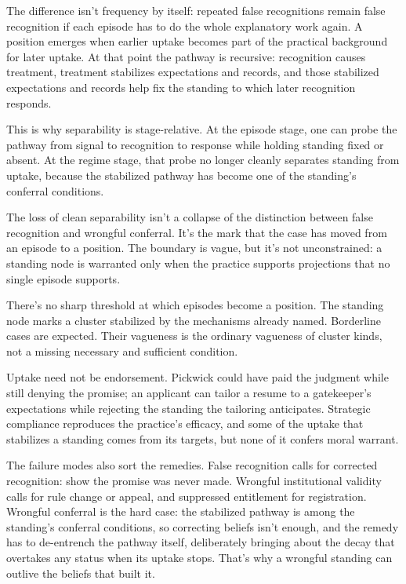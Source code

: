 \documentclass[12pt]{article}
\begin{document}
The difference isn't frequency by itself: repeated false recognitions remain false recognition if each episode has to do the whole explanatory work again. A position emerges when earlier uptake becomes part of the practical background for later uptake. At that point the pathway is recursive: recognition causes treatment, treatment stabilizes expectations and records, and those stabilized expectations and records help fix the standing to which later recognition responds.

This is why separability is stage-relative. At the episode stage, one can probe the pathway from signal to recognition to response while holding standing fixed or absent. At the regime stage, that probe no longer cleanly separates standing from uptake, because the stabilized pathway has become one of the standing's conferral conditions.

The loss of clean separability isn't a collapse of the distinction between false recognition and wrongful conferral. It's the mark that the case has moved from an episode to a position. The boundary is vague, but it's not unconstrained: a standing node is warranted only when the practice supports projections that no single episode supports.

There's no sharp threshold at which episodes become a position. The standing node marks a cluster stabilized by the mechanisms already named. Borderline cases are expected. Their vagueness is the ordinary vagueness of cluster kinds, not a missing necessary and sufficient condition.

Uptake need not be endorsement. Pickwick could have paid the judgment while still denying the promise; an applicant can tailor a resume to a gatekeeper's expectations while rejecting the standing the tailoring anticipates. Strategic compliance reproduces the practice's efficacy, and some of the uptake that stabilizes a standing comes from its targets, but none of it confers moral warrant.

The failure modes also sort the remedies. False recognition calls for corrected recognition: show the promise was never made. Wrongful institutional validity calls for rule change or appeal, and suppressed entitlement for registration. Wrongful conferral is the hard case: the stabilized pathway is among the standing's conferral conditions, so correcting beliefs isn't enough, and the remedy has to de-entrench the pathway itself, deliberately bringing about the decay that overtakes any status when its uptake stops. That's why a wrongful standing can outlive the beliefs that built it.
\end{document}
